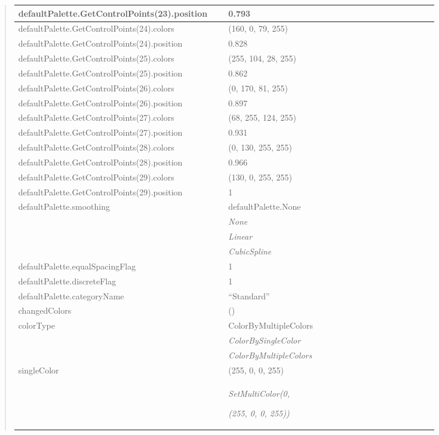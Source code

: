 \documentclass[letterpaper,10pt,english]{sphinxmanual}
\begin{document}
\begin{quote}
\begin{longtable}{|p{0.475\linewidth}|p{0.475\linewidth}|}
\\
\hline
defaultPalette.GetControlPoints(23).position
 & 
0.793
\\
\hline
defaultPalette.GetControlPoints(24).colors
 & 
(160, 0, 79, 255)
\\
\hline
defaultPalette.GetControlPoints(24).position
 & 
0.828
\\
\hline
defaultPalette.GetControlPoints(25).colors
 & 
(255, 104, 28, 255)
\\
\hline
defaultPalette.GetControlPoints(25).position
 & 
0.862
\\
\hline
defaultPalette.GetControlPoints(26).colors
 & 
(0, 170, 81, 255)
\\
\hline
defaultPalette.GetControlPoints(26).position
 & 
0.897
\\
\hline
defaultPalette.GetControlPoints(27).colors
 & 
(68, 255, 124, 255)
\\
\hline
defaultPalette.GetControlPoints(27).position
 & 
0.931
\\
\hline
defaultPalette.GetControlPoints(28).colors
 & 
(0, 130, 255, 255)
\\
\hline
defaultPalette.GetControlPoints(28).position
 & 
0.966
\\
\hline
defaultPalette.GetControlPoints(29).colors
 & 
(130, 0, 255, 255)
\\
\hline
defaultPalette.GetControlPoints(29).position
 & 
1
\\
\hline
defaultPalette.smoothing
 & 
defaultPalette.None
\\
\hline & 
\emph{None}
\\
\hline & 
\emph{Linear}
\\
\hline & 
\emph{CubicSpline}
\\
\hline
defaultPalette.equalSpacingFlag
 & 
1
\\
\hline
defaultPalette.discreteFlag
 & 
1
\\
\hline
defaultPalette.categoryName
 & 
``Standard''
\\
\hline
changedColors
 & 
()
\\
\hline
colorType
 & 
ColorByMultipleColors
\\
\hline & 
\emph{ColorBySingleColor}
\\
\hline & 
\emph{ColorByMultipleColors}
\\
\hline
singleColor
 & 
(255, 0, 0, 255)
\\
\hline & 
\begin{DUlineblock}{0em}
\item[] \emph{SetMultiColor(0,}
\item[] \emph{(255, 0, 0, 255))}

\end{DUlineblock}
\end{longtable}
\end{quote}
\end{document}
